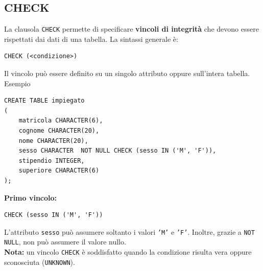 \subsection{CHECK}
La clausola \texttt{CHECK} permette di specificare
\textbf{vincoli di integrità} che devono essere
rispettati dai dati di una tabella.
La sintassi generale è:
\begin{verbatim}
CHECK (<condizione>)
\end{verbatim}
Il vincolo può essere definito su un singolo attributo
oppure sull'intera tabella.\\
\textcolor{verdeEsempio}{Esempio}
\begin{verbatim}
CREATE TABLE impiegato
(
    matricola CHARACTER(6),
    cognome CHARACTER(20),
    nome CHARACTER(20),
    sesso CHARACTER  NOT NULL CHECK (sesso IN ('M', 'F')),
    stipendio INTEGER,
    superiore CHARACTER(6)
);
\end{verbatim}
\textbf{Primo vincolo:}
\begin{verbatim}
CHECK (sesso IN ('M', 'F'))
\end{verbatim}
L'attributo \texttt{sesso} può assumere
soltanto i valori \texttt{'M'} e \texttt{'F'}.
Inoltre, grazie a \texttt{NOT NULL},
non può assumere il valore nullo.\\
\noindent
\textbf{Nota:} un vincolo \texttt{CHECK} è soddisfatto
quando la condizione risulta vera oppure sconosciuta
(\texttt{UNKNOWN}).
